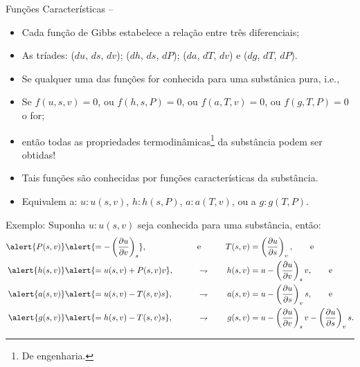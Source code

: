     \begin{frame}[allowframebreaks]{Funções Características --}

        \begin{itemize}
            \item Cada \alert{função de Gibbs} estabelece a relação entre três diferenciais;
            \item As tríades: \alert{($du$, $ds$, $dv$)}; \alert{($dh$, $ds$, $dP$)};
                \alert{($da$, $dT$, $dv$)} e \alert{($dg$, $dT$, $dP$)}.
            \item Se \alert{qualquer uma} das funções for conhecida para uma \alert{substânica
                pura}, i.e.,
            \item Se \alert{$f(u, s, v) = 0$}, ou \alert{$f(h, s, P) = 0$}, ou \alert{$f(a, T,
                v) = 0$}, ou \alert{$f(g, T, P) = 0$} o for;
            \item então \alert{todas} as propriedades termodinâmicas\footnote{De engenharia.} da
                substância podem ser obtidas!
            \item Tais funções são conhecidas por \alert{funções características} da substância.
            \item Equivalem a: \alert{$u\!:\!u(s, v)$}, \alert{$h\!:\!h(s, P)$},
                \alert{$a\!:\!a(T, v)$}, ou a \alert{$g\!:\!g(T, P)$}.
        \end{itemize}

        \pagebreak
        \alert{Exemplo}: Suponha \alert{$u\!:\!u(s, v)$} seja conhecida para uma substância,
        então:
        \begin{alignat*}{3}
            \alert{P(s, v)}     &\alert{=      -\dxyz uvs},             &   \qquad  & \mbox{e}\qquad        &   T(s, v)     &=  \dxyz usv,      \qquad\mbox{e}    \\
            \alert{h(s, v)}     &\alert{=      u(s, v) + P(s, v)v},     &   \qquad  & \rightharpoondown     &   h(s, v)     &=  u - \dxyz uvsv, \qquad\mbox{e}    \\
            \alert{a(s, v)}     &\alert{=      u(s, v) - T(s, v)s},     &   \qquad  & \rightharpoondown     &   a(s, v)     &=  u - \dxyz usvs, \qquad\mbox{e}    \\
            \alert{g(s, v)}     &\alert{=      h(s, v) - T(s, v)s},     &   \qquad  & \rightharpoondown     &   g(s, v)     &=  u - \dxyz uvsv - \dxyz usvs.
        \end{alignat*}

    \end{frame}

